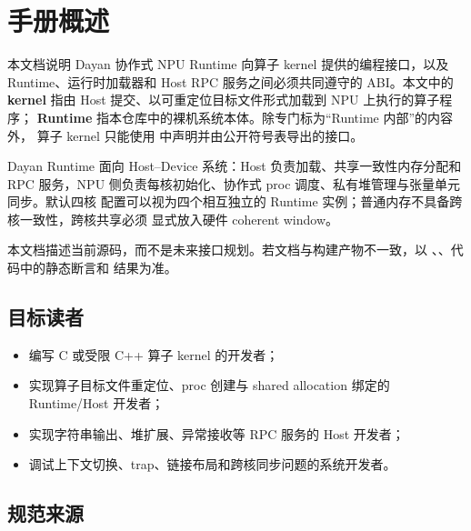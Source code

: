 \documentclass[../dayan_kernel_manual.tex]{subfiles}
\begin{document}
\section{手册概述}\label{sec:kernel-001}

本文档说明 Dayan 协作式 NPU Runtime 向算子 kernel 提供的编程接口，以及
Runtime、运行时加载器和 Host RPC 服务之间必须共同遵守的 ABI。本文中的
\textbf{kernel} 指由 Host 提交、以可重定位目标文件形式加载到 NPU 上执行的算子程序；
\textbf{Runtime} 指本仓库中的裸机系统本体。除专门标为“Runtime 内部”的内容外，
算子 kernel 只能使用  中声明并由公开符号表导出的接口。

Dayan Runtime 面向 Host--Device 系统：Host 负责加载、共享一致性内存分配和 RPC
服务，NPU 侧负责每核初始化、协作式 proc 调度、私有堆管理与张量单元同步。默认四核
配置可以视为四个相互独立的 Runtime 实例；普通内存不具备跨核一致性，跨核共享必须
显式放入硬件 coherent window。

\begin{dayannote}
本文档描述当前源码，而不是未来接口规划。若文档与构建产物不一致，以
、、代码中的静态断言和
 结果为准。
\end{dayannote}

\subsection{目标读者}

\begin{itemize}
  \item 编写 C 或受限 C++ 算子 kernel 的开发者；
  \item 实现算子目标文件重定位、proc 创建与 shared allocation 绑定的 Runtime/Host
        开发者；
  \item 实现字符串输出、堆扩展、异常接收等 RPC 服务的 Host 开发者；
  \item 调试上下文切换、trap、链接布局和跨核同步问题的系统开发者。
\end{itemize}

\subsection{规范来源}
\end{document}
